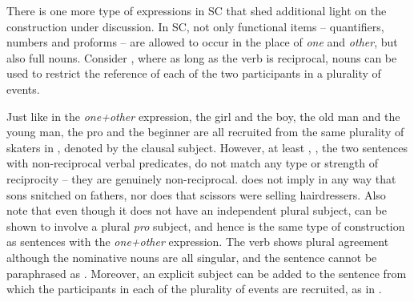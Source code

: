 \documentclass[output=paper,colorlinks,citecolor=brown]{langscibook}
\begin{document}
There is one more type of expressions in SC that shed additional light on the construction under discussion. In SC, not only functional items -- quantifiers, numbers and proforms -- are allowed to occur in the place of \textit{one} and \textit{other}, but also full nouns. Consider , where as long as the verb is reciprocal, nouns can be used to restrict the reference of each of the two participants in a plurality of events.

\ea\label{ex:Klizači1}
\label{ex:Klizači1-a}
\label{ex:Klizači1-b}
\label{ex:Klizači1-c}
\label{ex:Klizači1-d}
\z \z 

\noindent Just like in the \textit{one+other} expression, the girl and the boy, the old man and the young man, the pro and the beginner are all recruited from the same plurality of skaters in , denoted by the clausal subject. However, at least , , the two sentences with non-reciprocal verbal predicates, do not match any type or strength of reciprocity -- they are genuinely non-reciprocal.  does not imply in any way that sons snitched on fathers, nor does  that scissors were selling hairdressers. Also note that
even though it does not have an independent plural subject,  can be shown to involve a plural \textit{pro} subject, and hence is the same type of construction as sentences with the \textit{one+other} expression. The verb shows plural agreement although the nominative nouns are all singular, and the sentence cannot be paraphrased as . Moreover, an explicit subject can be added to the sentence from which the participants in each of the plurality of events are recruited, as in .
\end{document}
